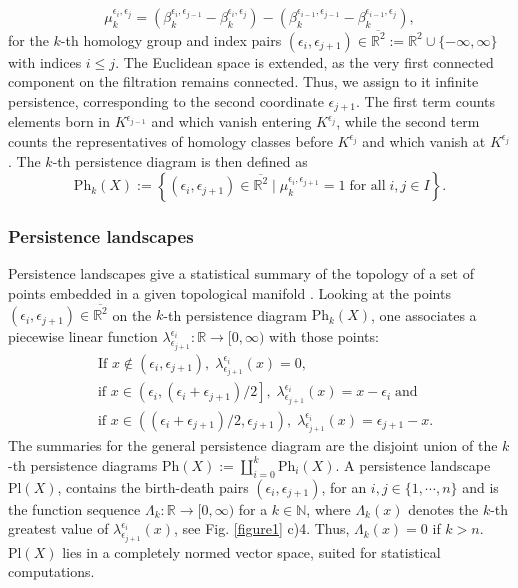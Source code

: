 \documentclass[runningheads,orivec]{llncs}
\begin{document}
\begin{equation}
\mu^{\epsilon_{i},\epsilon_{j}}_k = (\beta_k^{\epsilon_{i},\epsilon_{j-1}} - \beta_k^{\epsilon_i,\epsilon_{j}})-(\beta_k^{\epsilon_{i-1},\epsilon_{j-1}}-\beta_k^{\epsilon_{i-1},\epsilon_{j}}),
\end{equation}
for the $k$-th homology group and index pairs $(\epsilon_i,\epsilon_{j+1}) \in \overline{\mathbb{R}^2} := \mathbb{R}^2 \cup \{-\infty,\infty\}$ with indices $i \leq j$. The Euclidean space is extended, as the very first connected component on the filtration remains connected. Thus, we assign to it infinite persistence, corresponding to the second coordinate $\epsilon_{j+1}$. The first term counts elements born in $K^{\epsilon_{j-1}}$ and which vanish entering $K^{\epsilon_{j}}$, while the second term counts the representatives of homology classes before $K^{\epsilon_{j}}$ and which vanish at $K^{\epsilon_{j}}$. The $k$-th persistence diagram is then defined as
\begin{equation}
\text{Ph}_{k}(X) := \left\{(\epsilon_i, \epsilon_{j+1}) \in \overline{\mathbb{R}^2} \; \bigg\vert \; \mu^{\epsilon_{i},\epsilon_{j+1}}_k = 1 \; \text{for all} \; i,j \in I \right\}.
\end{equation}

\subsubsection{Persistence landscapes} Persistence landscapes give a statistical summary of the topology of a set of points embedded in a given topological manifold \cite{bubenik2015statistical}. Looking at the points $(\epsilon_i,\epsilon_{j+1}) \in \overline{\mathbb{R}^2}$ on the $k$-th persistence diagram $\text{Ph}_{k}(X)$, one associates a piecewise linear function $\lambda^{\epsilon_i}_{\epsilon_{j+1}}: \mathbb{R} \rightarrow [0,\infty)$ with those points:
\begin{align}
    &\text{If } x \not\in (\epsilon_i,\epsilon_{j+1}), \; \lambda^{\epsilon_i}_{\epsilon_{j+1}}(x) = 0,\\
    &\text{if } x \in \left(\epsilon_{i},(\epsilon_i + \epsilon_{j+1})/2 \right], \; \lambda^{\epsilon_i}_{\epsilon_{j+1}}(x) = x - \epsilon_{i} \; \text{and}\\
    &\text{if } x \in \left((\epsilon_i + \epsilon_{j+1})/2,\epsilon_{j+1} \right), \; \lambda^{\epsilon_i}_{\epsilon_{j+1}}(x) = \epsilon_{j+1} - x.
\end{align}
The summaries for the general persistence diagram are the disjoint union of the $k$-th persistence diagrams $\text{Ph}(X) := \coprod_{i=0}^{k} \text{Ph}_i(X)$. A persistence landscape $\text{Pl}(X)$, contains the birth-death pairs $(\epsilon_i,\epsilon_{j+1})$, for an $i,j \in \{1, \cdots, n\}$ and is the function sequence $\Lambda_k : \mathbb{R} \rightarrow [0,\infty)$ for a $k \in \mathbb{N}$, where $\Lambda_k(x)$ denotes the $k$-th greatest value of $\lambda^{\epsilon_i}_{\epsilon_{j+1}}(x)$, see Fig. \ref{figure1} c)4. Thus, $\Lambda_k(x) = 0$ if $k > n$. $\text{Pl}(X)$ lies in a completely normed vector space, suited for statistical computations.
\end{document}
